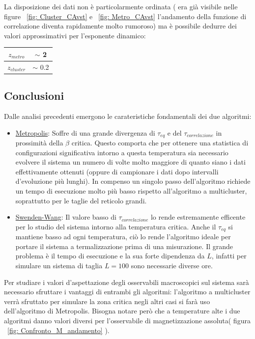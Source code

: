 La disposizione dei dati non è particolarmente ordinata ( era già visibile nelle figure ~\ref{fig: Cluster_CAvst} e ~\ref{fig: Metro_CAvst} l'andamento della funzione di correlazione diventa rapidamente molto rumoroso) ma è possibile dedurre dei valori approssimativi per l'esponente dinamico:
\begin{center}
\begin{tabular}{ | c | c |} 
\hline
$z_{metro}$ & $\sim$ 2 \\
\hline 
$z_{cluster}$ & $\sim$ 0.2 \\
\hline 
\end{tabular}
\end{center}

\subsection{Conclusioni}
Dalle analisi precedenti emergono le carateristiche fondamentali dei due algoritmi:
\begin{itemize}
\item \underline{Metropolis}: Soffre di una grande divergenza di $\tau_{eq}$ e del $\tau_{correlazione}$ in prossimità della $\beta$ critica. Questo comporta che per ottenere una statistica di configurazioni  significativa intorno a questa temperatura sia necessario evolvere il sistema un numero di volte molto maggiore di quanto siano i dati effettivamente ottenuti (oppure di campionare i dati dopo intervalli d'evoluzione più lunghi). 
In compenso un singolo passo dell'algoritmo richiede un tempo di esecuzione molto più basso rispetto all'algoritmo a multicluster, soprattutto per le taglie del reticolo grandi.
\item \underline{Swenden-Wang}: Il valore basso di $\tau_{correlazione}$ lo rende estremamente efficente per lo studio del sistema intorno alla temperatura critica. Anche il $\tau_{eq}$ si mantiene basso ad ogni temperatura, ciò lo rende l'algoritmo ideale per portare il sistema a termalizzazione prima di una misurazione. Il grande problema è il tempo di esecuzione e la sua forte dipendenza da $L$, infatti per simulare un sistema di taglia $L=100$ sono necessarie diverse ore. 
\end{itemize}
Per studiare i valori d'aspettazione degli osservabili macroscopici sul sistema sarà necessario sfruttare i vantaggi di entrambi gli algoritmi: l'algoritmo a multicluster verrà sfruttato per simulare la zona critica negli altri casi si farà uso dell'algoritmo di Metropolis.
\newline
Bisogna notare però che a temperature alte i due algoritmi danno valori diversi per l'osservabile di magnetizzazione assoluta( figura ~\ref{fig: Confronto_M_andamento} ).

